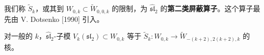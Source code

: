 
我们称 $\widetilde{S}_k$，或其到 $W_{0,k}\subset\widetilde{W}_{0,0,k}$ 的限制，为 $\widehat{\mathfrak{sl}}_2$ 的\textbf{第二类屏蔽算子}。这个算子最先由 V. Dotsenko [1990] 引入。

\begin{proposition}
    对一般的 $k$，$\widehat{\mathfrak{sl}}_2$-子模 $V_k(\mathfrak{sl}_2)\subset W_{0,k}$ 等于 $\widetilde{S}_k:W_{0,k}\to\widetilde{W}_{-(k+2),2(k+2),k}$ 的核。
\end{proposition}

